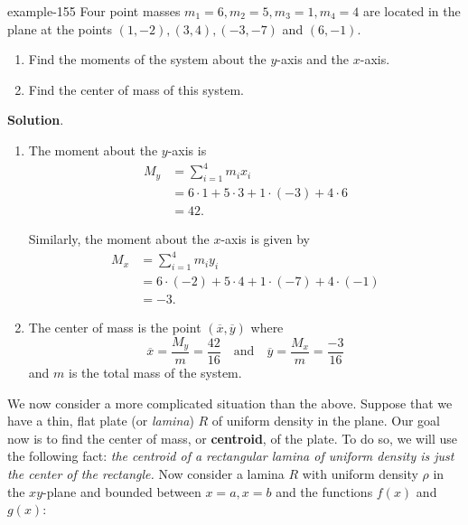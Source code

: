 \documentclass[10pt,]{book}
\newcommand{\terminology}[1]{\textbf{#1}}
\numberwithin{equation}{section}
\newcommand{\amp}{&}
\begin{document}
\begin{example}{}{example-155}%
\hypertarget{p-701}{}%
Four point masses \(m_{1} = 6,m_{2} = 5,m_{3} = 1,m_{4} = 4\) are located in the plane at the points \((1,-2),(3,4),(-3,-7)\) and \((6,-1)\). \leavevmode%
\begin{enumerate}
\item\hypertarget{li-59}{}\hypertarget{p-702}{}%
Find the moments of the system about the \(y\)-axis and the \(x\)-axis.%
\item\hypertarget{li-60}{}\hypertarget{p-703}{}%
Find the center of mass of this system.%
\end{enumerate}
%
\par\smallskip%
\noindent\textbf{Solution}.\hypertarget{solution-151}{}\quad%
\leavevmode%
\begin{enumerate}
\item\hypertarget{li-61}{}\hypertarget{p-704}{}%
The moment about the \(y\)-axis is%
\begin{align*}
M_{y}\amp= \sum_{i=1}^{4}m_{i}x_{i}\\
\amp= 6\cdot1+5\cdot3+1\cdot(-3)+4\cdot6\\
\amp= 42.
\end{align*}
%
\par
\hypertarget{p-705}{}%
Similarly, the moment about the \(x\)-axis is given by%
\begin{align*}
M_{x}\amp= \sum_{i=1}^{4}m_{i}y_{i}\\
\amp= 6\cdot(-2)+5\cdot4+1\cdot(-7)+4\cdot(-1)\\
\amp= -3.
\end{align*}
%
\item\hypertarget{li-62}{}\hypertarget{p-706}{}%
The center of mass is the point \((\overline{x},\overline{y})\) where%
\begin{equation*}
\overline{x} = \frac{M_{y}}{m} = \frac{42}{16}\quad\text{and}\quad\overline{y}=\frac{M_{x}}{m} = \frac{-3}{16}
\end{equation*}
and \(m\) is the total mass of the system.%
\end{enumerate}
\end{example}
\hypertarget{p-707}{}%
We now consider a more complicated situation than the above. Suppose that we have a thin, flat plate (or \emph{lamina}) \(R\) of uniform density in the plane. Our goal now is to find the center of mass, or \terminology{centroid}, of the plate. To do so, we will use the following fact: \emph{the centroid of a rectangular lamina of uniform density is just the center of the rectangle.} Now consider a lamina \(R\) with uniform density \(\rho\) in the \(xy\)-plane and bounded between \(x=a,x=b\) and the functions \(f(x)\) and \(g(x)\):%
\end{document}
